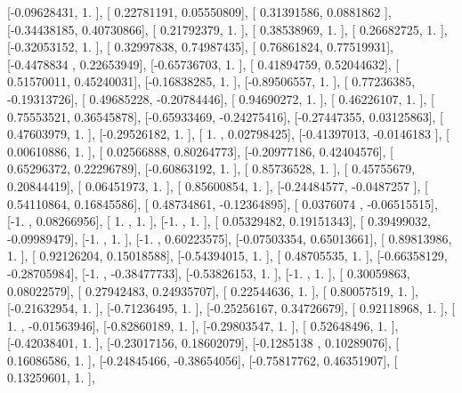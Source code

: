 \documentclass{article}
\begin{document}
       [-0.09628431,  1.        ],
       [ 0.22781191,  0.05550809],
       [ 0.31391586,  0.0881862 ],
       [-0.34438185,  0.40730866],
       [ 0.21792379,  1.        ],
       [ 0.38538969,  1.        ],
       [ 0.26682725,  1.        ],
       [-0.32053152,  1.        ],
       [ 0.32997838,  0.74987435],
       [ 0.76861824,  0.77519931],
       [-0.4478834 ,  0.22653949],
       [-0.65736703,  1.        ],
       [ 0.41894759,  0.52044632],
       [ 0.51570011,  0.45240031],
       [-0.16838285,  1.        ],
       [-0.89506557,  1.        ],
       [ 0.77236385, -0.19313726],
       [ 0.49685228, -0.20784446],
       [ 0.94690272,  1.        ],
       [ 0.46226107,  1.        ],
       [ 0.75553521,  0.36545878],
       [-0.65933469, -0.24275416],
       [-0.27447355,  0.03125863],
       [ 0.47603979,  1.        ],
       [-0.29526182,  1.        ],
       [ 1.        ,  0.02798425],
       [-0.41397013, -0.0146183 ],
       [ 0.00610886,  1.        ],
       [ 0.02566888,  0.80264773],
       [-0.20977186,  0.42404576],
       [ 0.65296372,  0.22296789],
       [-0.60863192,  1.        ],
       [ 0.85736528,  1.        ],
       [ 0.45755679,  0.20844419],
       [ 0.06451973,  1.        ],
       [ 0.85600854,  1.        ],
       [-0.24484577, -0.0487257 ],
       [ 0.54110864,  0.16845586],
       [ 0.48734861, -0.12364895],
       [ 0.0376074 , -0.06515515],
       [-1.        ,  0.08266956],
       [ 1.        ,  1.        ],
       [-1.        ,  1.        ],
       [ 0.05329482,  0.19151343],
       [ 0.39499032, -0.09989479],
       [-1.        ,  1.        ],
       [-1.        ,  0.60223575],
       [-0.07503354,  0.65013661],
       [ 0.89813986,  1.        ],
       [ 0.92126204,  0.15018588],
       [-0.54394015,  1.        ],
       [ 0.48705535,  1.        ],
       [-0.66358129, -0.28705984],
       [-1.        , -0.38477733],
       [-0.53826153,  1.        ],
       [-1.        ,  1.        ],
       [ 0.30059863,  0.08022579],
       [ 0.27942483,  0.24935707],
       [ 0.22544636,  1.        ],
       [ 0.80057519,  1.        ],
       [-0.21632954,  1.        ],
       [-0.71236495,  1.        ],
       [-0.25256167,  0.34726679],
       [ 0.92118968,  1.        ],
       [ 1.        , -0.01563946],
       [-0.82860189,  1.        ],
       [-0.29803547,  1.        ],
       [ 0.52648496,  1.        ],
       [-0.42038401,  1.        ],
       [-0.23017156,  0.18602079],
       [-0.1285138 ,  0.10289076],
       [ 0.16086586,  1.        ],
       [-0.24845466, -0.38654056],
       [-0.75817762,  0.46351907],
       [ 0.13259601,  1.        ],
\end{document}
